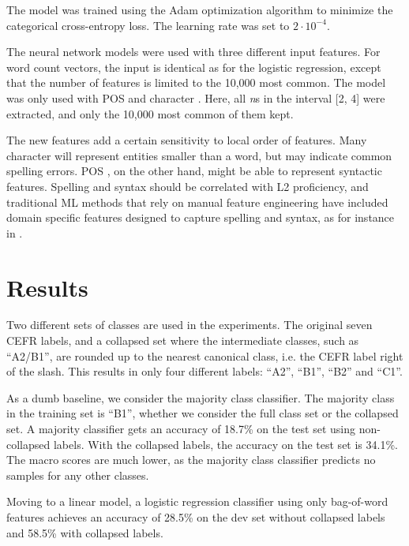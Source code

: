The model was trained using the Adam optimization algorithm
\autocite{kingma2014adam} to minimize the categorical cross-entropy loss. The
learning rate was set to $2\cdot 10^{-4}$.

The neural network models were used with three different input features. For
word count vectors, the input is identical as for the logistic regression,
except that the number of features is limited to the 10,000 most common. 
The model was only used with \ac{POS} and character \ngrams. Here, all 
\textit{n}s in the interval [2, 4] were extracted, and only the 10,000 most
common of them kept.

The new \ngram features add a certain sensitivity to local order of features.
Many character \ngrams will represent entities smaller than a word, but may
indicate common spelling errors. \ac{POS} \ngrams, on the other hand, might
be able to represent syntactic features. Spelling and syntax should be
correlated with L2 proficiency, and traditional \ac{ML} methods that rely on
manual feature engineering have included domain specific features designed to
capture spelling and syntax, as for instance in \textcite{vajjala17}.


\section{Results}

Two different sets of classes are used in the experiments. The original seven
CEFR labels, and a collapsed set where the intermediate classes, such as
``A2/B1'', are rounded up to the nearest canonical class, i.e. the CEFR label
right of the slash. This results in only four different labels: ``A2'',
``B1'', ``B2'' and ``C1''.

As a dumb baseline, we consider the majority class classifier. The majority
class in the training set is ``B1'', whether we consider the full class set
or the collapsed set. A majority classifier gets an accuracy of 18.7\% on the
test set using non-collapsed labels. With the collapsed labels, the accuracy
on the test set is 34.1\%. The macro \FI scores are much lower, as the
majority class classifier predicts no samples for any other classes.

Moving to a linear model, a logistic regression classifier using only
bag-of-word features achieves an accuracy of 28.5\% on the dev set without
collapsed labels and 58.5\% with collapsed labels. 

